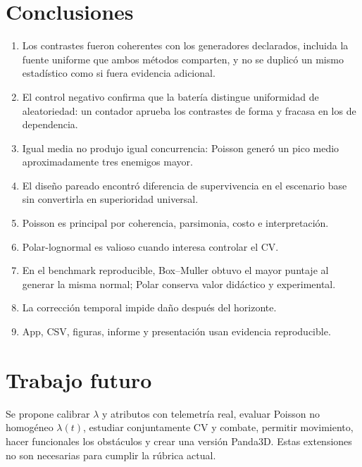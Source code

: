 \documentclass[11pt,a4paper]{article}
\begin{document}
\section{Conclusiones}

\begin{enumerate}
  \item Los \TestCount{} contrastes fueron coherentes con los generadores
        declarados, incluida la fuente uniforme que ambos métodos comparten, y
        no se duplicó un mismo estadístico como si fuera evidencia adicional.
  \item El control negativo confirma que la batería distingue uniformidad de
        aleatoriedad: un contador aprueba los contrastes de forma y fracasa en
        los de dependencia.
  \item Igual media no produjo igual concurrencia: Poisson generó un pico medio
        aproximadamente tres enemigos mayor.
  \item El diseño pareado encontró diferencia de supervivencia en el escenario
        base sin convertirla en superioridad universal.
  \item Poisson es principal por coherencia, parsimonia, costo e interpretación.
  \item Polar-lognormal es valioso cuando interesa controlar el CV.
  \item En el benchmark reproducible, Box--Muller obtuvo el mayor puntaje al
        generar la misma normal; Polar conserva valor didáctico y experimental.
  \item La corrección temporal impide daño después del horizonte.
  \item App, CSV, figuras, informe y presentación usan evidencia reproducible.
\end{enumerate}

\section{Trabajo futuro}

Se propone calibrar $\lambda$ y atributos con telemetría real, evaluar Poisson
no homogéneo $\lambda(t)$, estudiar conjuntamente CV y combate, permitir
movimiento, hacer funcionales los obstáculos y crear una versión Panda3D. Estas
extensiones no son necesarias para cumplir la rúbrica actual.
\end{document}
